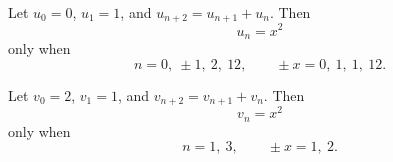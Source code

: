 \begin{proposition}
Let $u_0=0$, $u_1=1$, and $u_{n+2}=u_{n+1}+u_n$. Then
\[
    u_n=x^2
\]
only when
\[
    n=0,\ \pm1,\ 2,\ 12,\qquad \pm x=0,\ 1,\ 1,\ 12.
\]
\end{proposition}

\begin{proposition}
Let $v_0=2$, $v_1=1$, and $v_{n+2}=v_{n+1}+v_n$. Then
\[
    v_n=x^2
\]
only when
\[
    n=1,\ 3,\qquad \pm x=1,\ 2.
\]
\end{proposition}
